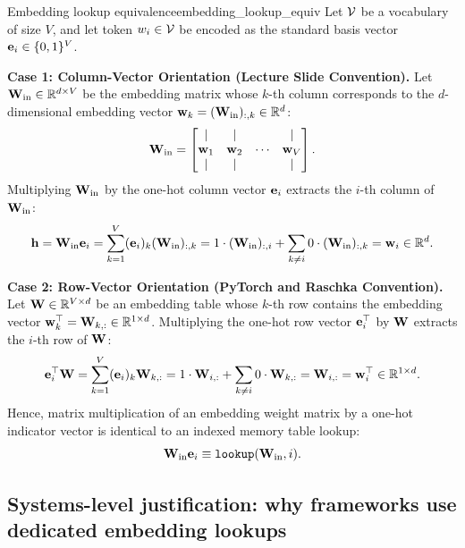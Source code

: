 \documentclass[../../main.tex]{subfiles}
\begin{document}
\begin{theorem}{Embedding lookup equivalence}{embedding_lookup_equiv}
Let $\mathcal{V}$ be a vocabulary of size $V$, and let token $w_i \in \mathcal{V}$ be encoded as the standard basis vector $\mathbf{e}_i \in \{0, 1\}^V$.

\noindent\textbf{Case 1: Column-Vector Orientation (Lecture Slide Convention).}  
Let $\mathbf{W}_{\text{in}} \in \mathbb{R}^{d \times V}$ be the embedding matrix whose $k$-th column corresponds to the $d$-dimensional embedding vector $\mathbf{w}_k = (\mathbf{W}_{\text{in}})_{:, k} \in \mathbb{R}^d$:
\begin{equation}
\label{eq:win_column_blocks}
\mathbf{W}_{\text{in}} = \begin{bmatrix} \vert & \vert & & \vert \\ \mathbf{w}_1 & \mathbf{w}_2 & \cdots & \mathbf{w}_V \\ \vert & \vert & & \vert \end{bmatrix}.
\end{equation}
Multiplying $\mathbf{W}_{\text{in}}$ by the one-hot column vector $\mathbf{e}_i$ extracts the $i$-th column of $\mathbf{W}_{\text{in}}$:
\begin{equation}
\label{eq:column_lookup_proof}
\mathbf{h} = \mathbf{W}_{\text{in}} \mathbf{e}_i = \sum_{k=1}^V (\mathbf{e}_i)_k (\mathbf{W}_{\text{in}})_{:, k} = 1 \cdot (\mathbf{W}_{\text{in}})_{:, i} + \sum_{k \neq i} 0 \cdot (\mathbf{W}_{\text{in}})_{:, k} = \mathbf{w}_i \in \mathbb{R}^d.
\end{equation}

\noindent\textbf{Case 2: Row-Vector Orientation (PyTorch and Raschka Convention).}  
Let $\mathbf{W} \in \mathbb{R}^{V \times d}$ be an embedding table whose $k$-th row contains the embedding vector $\mathbf{w}_k^\top = \mathbf{W}_{k, :} \in \mathbb{R}^{1 \times d}$. Multiplying the one-hot row vector $\mathbf{e}_i^\top$ by $\mathbf{W}$ extracts the $i$-th row of $\mathbf{W}$:
\begin{equation}
\label{eq:row_lookup_proof}
\mathbf{e}_i^\top \mathbf{W} = \sum_{k=1}^V (\mathbf{e}_i)_k \mathbf{W}_{k, :} = 1 \cdot \mathbf{W}_{i, :} + \sum_{k \neq i} 0 \cdot \mathbf{W}_{k, :} = \mathbf{W}_{i, :} = \mathbf{w}_i^\top \in \mathbb{R}^{1 \times d}.
\end{equation}
Hence, matrix multiplication of an embedding weight matrix by a one-hot indicator vector is identical to an indexed memory table lookup:
\begin{equation}
\label{eq:lookup_linear_identity}
\mathbf{W}_{\text{in}} \mathbf{e}_i \equiv \text{\texttt{lookup}}(\mathbf{W}_{\text{in}}, i).
\end{equation}
\end{theorem}

\subsection{Systems-level justification: why frameworks use dedicated embedding lookups}
\label{subsec:systems_embedding_justification}
\end{document}
